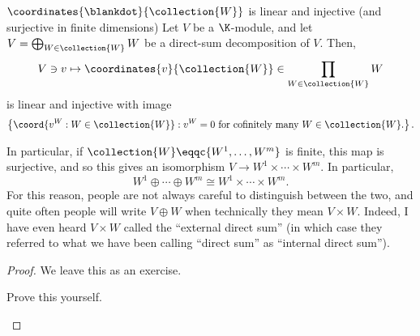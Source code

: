 \begin{prp}{$\coordinates{\blankdot}{\collection{W}}$ is linear and injective (and surjective in finite dimensions)}{}
	Let $V$ be a $\K$-module, and let $V=\bigoplus _{W\in \collection{W}}W$ be a direct-sum decomposition of $V$.  Then,
	\begin{equation}
		V\ni v\mapsto \coordinates{v}{\collection{W}}\in \prod _{W\in \collection{W}}W
	\end{equation}
	is linear and injective with image
	\begin{equation}
		\left\{ \coord{v^W:W\in \collection{W}}:v^W=0\text{ for cofinitely many }W\in \collection{W}\text{.}\right\} .
	\end{equation}
	\begin{rmk}
		In particular, if $\collection{W}\eqqc \{ W^1,\ldots ,W^m\}$ is finite, this map is surjective, and so this gives an isomorphism $V\rightarrow W^1\times \cdots \times W^m$.  In particular,
		\begin{equation}
			W^1\oplus \cdots \oplus W^m\cong W^1\times \cdots \times W^m.
		\end{equation}
		For this reason, people are not always careful to distinguish between the two, and quite often people will write $V\oplus W$ when technically they mean $V\times W$.  Indeed, I have even heard $V\times W$ called the ``external direct sum'' (in which case they referred to what we have been calling ``direct sum'' as ``internal direct sum'').
	\end{rmk}
	\begin{proof}
		We leave this as an exercise.
		\begin{exr}[breakable=false]{}{}
			Prove this yourself.
		\end{exr}
	\end{proof}
\end{prp}

